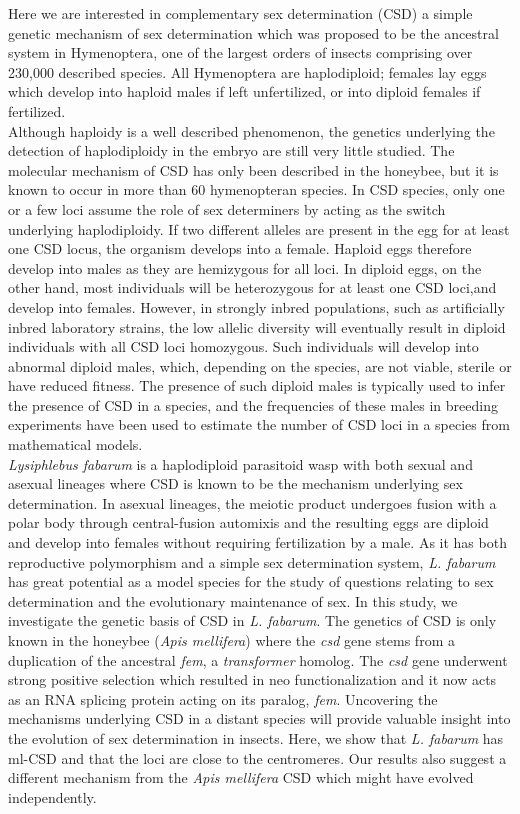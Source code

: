 \documentclass[11pt,a4paper]{report}
\begin{document}
Here we are interested in complementary sex determination (CSD) a simple genetic mechanism of sex determination which was proposed to be the ancestral system in Hymenoptera, one of the largest orders of insects comprising over 230,000 described species. All Hymenoptera are haplodiploid; females lay eggs which develop into haploid males if left unfertilized, or into diploid females if fertilized. \\
Although haploidy is a well described phenomenon, the genetics underlying the detection of haplodiploidy in the embryo are still very little studied. The molecular mechanism of CSD has only been described in the honeybee, but  it is known to occur in more than 60 hymenopteran species. In CSD species, only one or a few loci assume the role of sex determiners by acting as the switch underlying haplodiploidy. If two different alleles are present in the egg for at least one CSD locus, the organism develops into a female. Haploid eggs therefore develop into males as they are hemizygous for all loci. In diploid eggs, on the other hand, most individuals will be heterozygous for at least one CSD loci,and develop into females. However, in strongly inbred populations, such as artificially inbred laboratory strains, the low allelic diversity will eventually result in diploid individuals with all CSD loci homozygous. Such individuals will develop into abnormal diploid males, which, depending on the species, are not viable, sterile or have reduced fitness. The presence of such diploid males is typically used to infer the presence of CSD in a species, and the frequencies of these males in breeding experiments have been used to estimate the number of CSD loci in a species from mathematical models.\\
\textit{Lysiphlebus fabarum} is a haplodiploid parasitoid wasp with both sexual and asexual lineages where CSD is known to be the mechanism underlying sex determination. In asexual lineages, the meiotic product undergoes fusion with a polar body through central-fusion automixis and the resulting eggs are diploid and develop into females without requiring fertilization by a male. As it has both reproductive polymorphism and a simple sex determination system, \textit{L. fabarum} has great potential as a model species for the study of questions relating to sex determination and the evolutionary maintenance of sex. 
In this study, we investigate the genetic basis of CSD in \textit{L. fabarum}. The genetics of CSD is only known in the honeybee (\textit{Apis mellifera}) where the \textit{csd} gene stems from a duplication of the ancestral \textit{fem}, a \textit{transformer} homolog. The \textit{csd} gene underwent strong positive selection which resulted in neo functionalization and it now acts as an RNA splicing protein acting on its paralog, \textit{fem}. Uncovering the mechanisms underlying CSD in a distant species will provide valuable insight into the evolution of sex determination in insects. Here, we show that \textit{L. fabarum} has ml-CSD and that the loci are close to the centromeres. Our results also suggest a different mechanism from the \textit{Apis mellifera} CSD which might have evolved independently.
\end{document}
